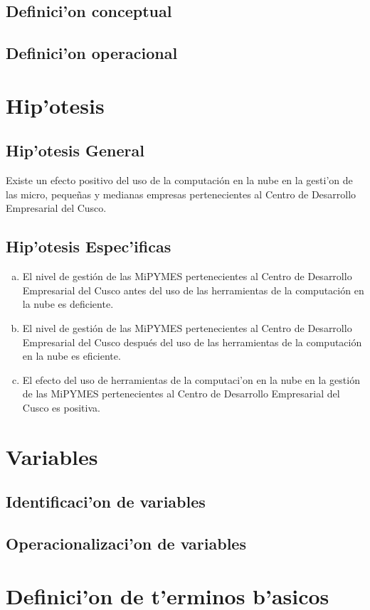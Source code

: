 \subsection{Definici'on conceptual}

\subsection{Definici'on operacional}

\section{Hip'otesis}

\subsection{Hip'otesis General}

Existe un efecto positivo del uso de la computaci\'on en la nube en la
gesti'on de las micro, peque\~nas y medianas empresas pertenecientes al Centro de
Desarrollo Empresarial del Cusco.

\subsection{Hip'otesis Espec'ificas}
\begin{enumerate}[a.]
    \item El nivel de gesti\'on de las MiPYMES pertenecientes al Centro de Desarrollo
          Empresarial del Cusco antes del uso de las herramientas de la computaci\'on
          en la nube es deficiente.
    \item El nivel de gesti\'on de las MiPYMES pertenecientes al Centro de Desarrollo
          Empresarial del Cusco despu\'es del uso de las herramientas de la computaci\'on
          en la nube es eficiente.
    \item El efecto del uso de herramientas de la computaci'on en la nube en la
          gesti\'on de las MiPYMES pertenecientes al Centro de Desarrollo Empresarial
          del Cusco es positiva.
\end{enumerate}

\section{Variables}

\subsection{Identificaci'on de variables}

\subsection{Operacionalizaci'on de variables}

\section{Definici'on de t'erminos b'asicos}
